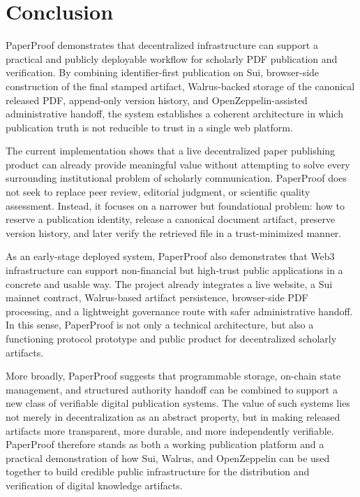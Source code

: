 \documentclass[journal]{IEEEtran}
\begin{document}
\section{Conclusion}

PaperProof demonstrates that decentralized infrastructure can support a practical and publicly deployable workflow for scholarly PDF publication and verification. By combining identifier-first publication on Sui, browser-side construction of the final stamped artifact, Walrus-backed storage of the canonical released PDF, append-only version history, and OpenZeppelin-assisted administrative handoff, the system establishes a coherent architecture in which publication truth is not reducible to trust in a single web platform.

The current implementation shows that a live decentralized paper publishing product can already provide meaningful value without attempting to solve every surrounding institutional problem of scholarly communication. PaperProof does not seek to replace peer review, editorial judgment, or scientific quality assessment. Instead, it focuses on a narrower but foundational problem: how to reserve a publication identity, release a canonical document artifact, preserve version history, and later verify the retrieved file in a trust-minimized manner.

As an early-stage deployed system, PaperProof also demonstrates that Web3 infrastructure can support non-financial but high-trust public applications in a concrete and usable way. The project already integrates a live website, a Sui mainnet contract, Walrus-based artifact persistence, browser-side PDF processing, and a lightweight governance route with safer administrative handoff. In this sense, PaperProof is not only a technical architecture, but also a functioning protocol prototype and public product for decentralized scholarly artifacts.

More broadly, PaperProof suggests that programmable storage, on-chain state management, and structured authority handoff can be combined to support a new class of verifiable digital publication systems. The value of such systems lies not merely in decentralization as an abstract property, but in making released artifacts more transparent, more durable, and more independently verifiable. PaperProof therefore stands as both a working publication platform and a practical demonstration of how Sui, Walrus, and OpenZeppelin can be used together to build credible public infrastructure for the distribution and verification of digital knowledge artifacts.








\end{document}
